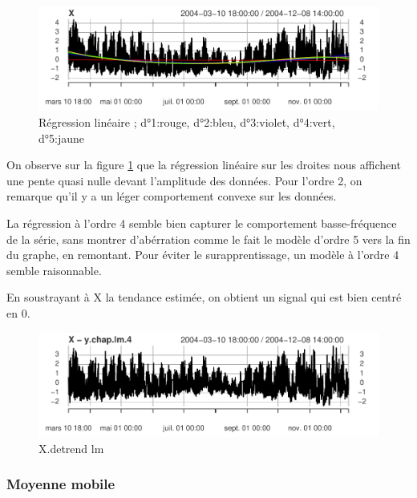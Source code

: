 \documentclass[
]{article}
\begin{document}
\begin{figure}

{\centering \includegraphics{STA202_report_files/figure-latex/lm_fig-1} 

}

\caption{\label{fig:lm_fig} Régression linéaire ; d°1:rouge, d°2:bleu, d°3:violet, d°4:vert, d°5:jaune}\label{fig:lm_fig}
\end{figure}

On observe sur la figure \ref{fig:lm_fig} que la régression linéaire sur
les droites nous affichent une pente quasi nulle devant l'amplitude des
données. Pour l'ordre 2, on remarque qu'il y a un léger comportement
convexe sur les données.

La régression à l'ordre 4 semble bien capturer le comportement
basse-fréquence de la série, sans montrer d'abérration comme le fait le
modèle d'ordre 5 vers la fin du graphe, en remontant. Pour éviter le
surapprentissage, un modèle à l'ordre 4 semble raisonnable.

En soustrayant à X la tendance estimée, on obtient un signal qui est
bien centré en 0.

\begin{figure}

{\centering \includegraphics{STA202_report_files/figure-latex/X.detrend.lm-1} 

}

\caption{\label{fig:X.detrend.lm} X.detrend lm}\label{fig:X.detrend.lm}
\end{figure}

\hypertarget{moyenne-mobile}{%
\subsubsection{Moyenne mobile}\label{moyenne-mobile}}
\end{document}
